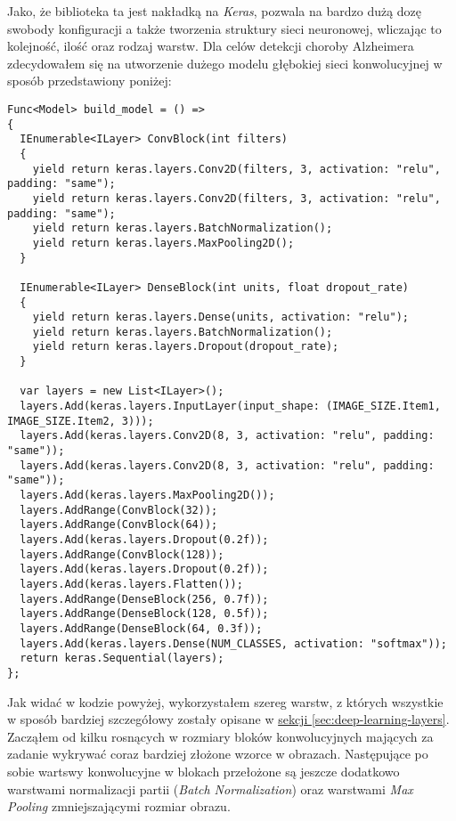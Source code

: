 Jako, że biblioteka ta jest nakładką na \emph{Keras}, pozwala na bardzo dużą dozę swobody konfiguracji a także tworzenia struktury sieci neuronowej, wliczając to kolejność, ilość oraz rodzaj warstw.
Dla celów detekcji choroby Alzheimera zdecydowałem się na utworzenie dużego modelu głębokiej sieci konwolucyjnej w sposób przedstawiony poniżej:

\begin{lstlisting}[language={[Sharp]C}]
Func<Model> build_model = () =>
{
  IEnumerable<ILayer> ConvBlock(int filters)
  {
    yield return keras.layers.Conv2D(filters, 3, activation: "relu", padding: "same");
    yield return keras.layers.Conv2D(filters, 3, activation: "relu", padding: "same");
    yield return keras.layers.BatchNormalization();
    yield return keras.layers.MaxPooling2D();
  }

  IEnumerable<ILayer> DenseBlock(int units, float dropout_rate)
  {
    yield return keras.layers.Dense(units, activation: "relu");
    yield return keras.layers.BatchNormalization();
    yield return keras.layers.Dropout(dropout_rate);
  }

  var layers = new List<ILayer>();
  layers.Add(keras.layers.InputLayer(input_shape: (IMAGE_SIZE.Item1, IMAGE_SIZE.Item2, 3)));
  layers.Add(keras.layers.Conv2D(8, 3, activation: "relu", padding: "same"));
  layers.Add(keras.layers.Conv2D(8, 3, activation: "relu", padding: "same"));
  layers.Add(keras.layers.MaxPooling2D());
  layers.AddRange(ConvBlock(32));
  layers.AddRange(ConvBlock(64));
  layers.Add(keras.layers.Dropout(0.2f));
  layers.AddRange(ConvBlock(128));
  layers.Add(keras.layers.Dropout(0.2f));
  layers.Add(keras.layers.Flatten());
  layers.AddRange(DenseBlock(256, 0.7f));
  layers.AddRange(DenseBlock(128, 0.5f));
  layers.AddRange(DenseBlock(64, 0.3f));
  layers.Add(keras.layers.Dense(NUM_CLASSES, activation: "softmax"));
  return keras.Sequential(layers);
};
\end{lstlisting}

Jak widać w kodzie powyżej, wykorzystałem szereg warstw, z których wszystkie w sposób bardziej szczegółowy zostały opisane w \hyperref[sec:deep-learning-layers]{sekcji \ref*{sec:deep-learning-layers}}.
Zacząłem od kilku rosnących w rozmiary bloków konwolucyjnych mających za zadanie wykrywać coraz bardziej złożone wzorce w obrazach.
Następujące po sobie wartswy konwolucyjne w blokach przełożone są jeszcze dodatkowo warstwami normalizacji partii (\emph{Batch Normalization}) oraz warstwami \emph{Max Pooling} zmniejszającymi rozmiar obrazu.

